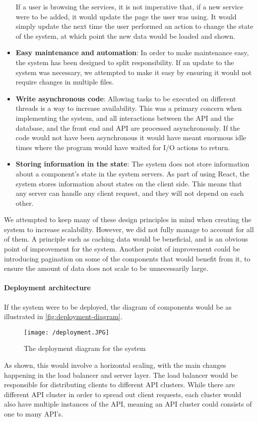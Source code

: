 \begin{itemize}
    If a user is browsing the services, it is not imperative that, if a new service were to be added, it would update the page the user was using.
    It would simply update the next time the user performed an action to change the state of the system, at which point the new data would be loaded and shown.
    \item \textbf{Easy maintenance and automation}: In order to make maintenance easy, the system has been designed to split responsibility.
    If an update to the system was necessary, we attempted to make it easy by ensuring it would not require changes in multiple files.
    \item \textbf{Write asynchronous code}: Allowing tasks to be executed on different threads is a way to increase availability. 
    This was a primary concern when implementing the system, and all interactions between the API and the database, and the front end and API are processed asynchronously.
    If the code would not have been asynchronous it would have meant enormous idle times where the program would have waited for I/O actions to return.
    \item \textbf{Storing information in the state}: The system does not store information about a component's state in the system servers.
    As part of using React, the system stores information about states on the client side.
    This means that any server can handle any client request, and they will not depend on each other.
\end{itemize}
We attempted to keep many of these design principles in mind when creating the system to increase scalability.
However, we did not fully manage to account for all of them.
A principle such as caching data would be beneficial, and is an obvious point of improvement for the system.
Another point of improvement could be introducing pagination on some of the components that would benefit from it, to ensure the amount of data does not scale to be unnecessarily large.

\paragraph{Deployment architecture}
If the system were to be deployed, the diagram of components would be as illustrated in \autoref{fig:deployment-diagram}.
\begin{figure}[H]
    \texttt{[image: /deployment.JPG]}
     \caption{The deployment diagram for the system}
     \label{fig:deployment-diagram}
 \end{figure}
 \noindent
As shown, this would involve a horizontal scaling, with the main changes happening in the load balancer and server layer.
The load balancer would be responsible for distributing clients to different API clusters.
While there are different API cluster in order to spread out client requests, each cluster would also have multiple instances of the API, meaning an API cluster could consists of one to many API's.


